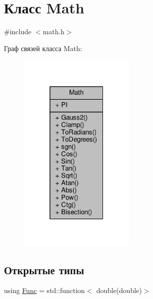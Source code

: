 \hypertarget{class_math}{}\section{Класс Math}
\label{class_math}


{\ttfamily \#include $<$math.\+h$>$}



Граф связей класса Math\+:
\nopagebreak
\begin{figure}[H]
\begin{center}
\leavevmode
\includegraphics[width=160pt]{df/da4/class_math__coll__graph}
\end{center}
\end{figure}
\subsection*{Открытые типы}
\begin{DoxyCompactItemize}
\item 
using \hyperlink{class_math_ab9fef5c7ba3bd81d13008e8a36abc655}{Func} = std\+::function$<$ double(double)$>$
\end{DoxyCompactItemize}
